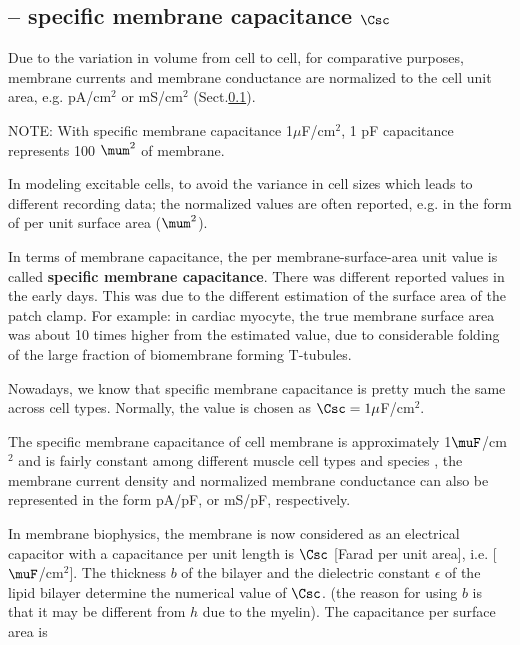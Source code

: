 \subsection{-- specific membrane capacitance $\Csc$}
\label{sec:specific-membrane-capacitance}

Due to the variation in volume from cell to cell, for comparative purposes,
membrane currents and membrane conductance are normalized to the cell unit area,
e.g. pA/cm$^2$ or mS/cm$^2$ (Sect.\ref{sec:specific-membrane-capacitance}).

NOTE: With specific membrane capacitance 1$\mu$F/cm$^2$, 1 pF capacitance
represents 100 $\mum^2$ of membrane.

In modeling excitable cells, to avoid the variance in cell sizes
which leads to different recording data; the normalized values are often
reported, e.g. in the form of per unit surface area ($\mum^2$). 

In terms of membrane capacitance, the per membrane-surface-area unit value is
called {\bf specific membrane capacitance}.
There was different reported values in the early days.
This was due to the different estimation of the surface area of the patch clamp.
For example: in cardiac myocyte, the true membrane surface area was about 10
times higher from the estimated value, due to considerable folding of the large
fraction of biomembrane forming T-tubules.


Nowadays, we know that specific membrane capacitance is pretty much
the same across cell types. Normally, the value is chosen as
$\Csc=1\mu$F/cm$^2$.


The specific membrane capacitance of cell membrane is approximately
1$\muF$/cm$^2$ and is fairly constant among different muscle cell types and
species \citep{hille1992mb}, the membrane current density and normalized
membrane conductance can also be represented in the form pA/pF, or mS/pF,
respectively.


In membrane biophysics, the membrane is now considered as an electrical
capacitor with a capacitance per unit length is $\Csc$ [Farad per unit area],
i.e. [$\muF$/cm$^2$]. The thickness $b$ of the bilayer and the dielectric
constant $\epsilon$ of the lipid bilayer determine the numerical value of $\Csc$. 
(the reason for using $b$ is that it may be different from $h$ due to the
myelin). The capacitance per surface area is

